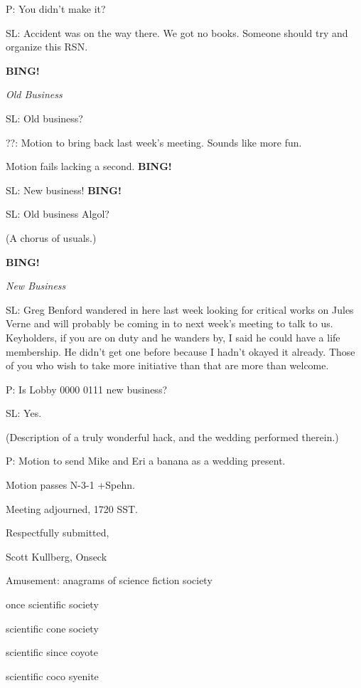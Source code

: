 \documentclass[12pt]{article}
\newcommand{\bing}{{\bf BING!} }
\newcommand{\goto}[1]{\bing \vskip 12pt \centerline{{\em{#1}}}}
\begin{document}
P: You didn't make it?

SL: Accident was on the way there. We got no books. Someone should try and organize this RSN.

\goto{Old Business}

SL: Old business?

??: Motion to bring back last week's meeting. Sounds like more fun.

Motion fails lacking a second. \bing

SL: New business! \bing

SL: Old business Algol?

(A chorus of usuals.)

\goto{New Business}

SL: Greg Benford wandered in here last week looking for critical works on Jules Verne and will probably be coming in to next week's meeting to talk to us. Keyholders, if you are on duty and he wanders by, I said he could have a life membership. He didn't get one before because I hadn't okayed it already. Those of you who wish to take more initiative than that are more than welcome.

P: Is Lobby 0000 0111 new business?

SL: Yes.

(Description of a truly wonderful hack, and the wedding performed therein.)

P: Motion to send Mike and Eri a banana as a wedding present.

Motion passes N-3-1 +Spehn.

\vspace{12pt}

\noindent
Meeting adjourned, 1720 SST.

\vspace{18pt}

\centerline{Respectfully submitted,}
\centerline{Scott Kullberg, Onseck}
\centerline{Amusement: anagrams of science fiction society}
\centerline{once scientific society}
\centerline{scientific cone society}
\centerline{scientific since coyote}
\centerline{scientific coco syenite}
\end{document}
